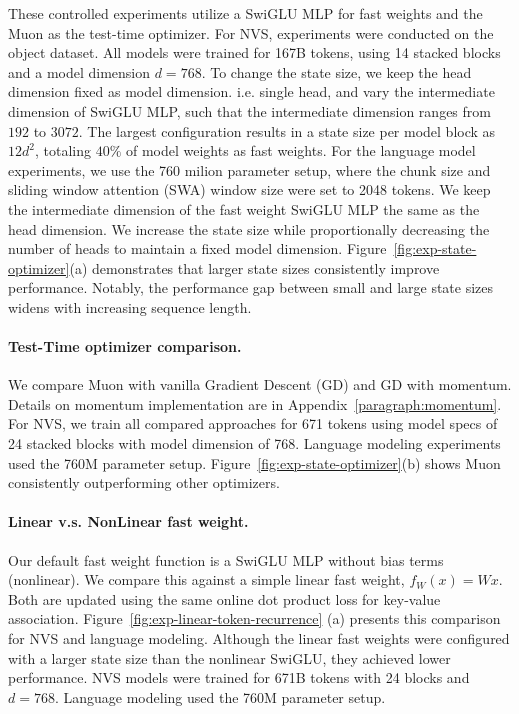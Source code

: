 \documentclass{article}
\begin{document}
These controlled experiments utilize a SwiGLU MLP for fast weights and the Muon as the test-time optimizer.
For NVS, experiments were conducted on the object dataset. All models were trained for 167B tokens, using 14 stacked blocks and a model dimension $d=768$. To change the state size, we keep the head dimension fixed as model dimension. i.e. single head, and vary the intermediate dimension of SwiGLU MLP, such that the intermediate dimension ranges from $192$ to $3072$. The largest configuration results in a state size per model block as $12d^2$, totaling $40\%$ of model weights as fast weights.  For the language model experiments, we use the 760 milion parameter setup, where the chunk size and sliding window attention (SWA) window size were set to 2048 tokens. We keep the intermediate dimension of the fast weight SwiGLU MLP the same as the head dimension. We increase the state size while proportionally decreasing the number of heads to maintain a fixed model dimension. Figure~\ref{fig:exp-state-optimizer}(a) demonstrates that larger state sizes consistently improve performance. Notably, the performance gap between small and large state sizes widens with increasing sequence length.

\paragraph{Test-Time optimizer comparison. }
We compare Muon with vanilla Gradient Descent (GD) and GD with momentum. Details on momentum implementation are in Appendix~\ref{paragraph:momentum}.   For NVS, we train all compared approaches for 671 tokens using model specs of 24 stacked blocks with model dimension of 768. Language modeling experiments used the 760M parameter setup. Figure~\ref{fig:exp-state-optimizer}(b) shows Muon consistently outperforming other optimizers.

\paragraph{Linear v.s. NonLinear fast weight.} Our default fast weight function is a SwiGLU MLP without bias terms (nonlinear). We compare this against a simple linear fast weight, $f_W(x) = Wx$. Both are updated using the same online dot product loss for key-value association. Figure~\ref{fig:exp-linear-token-recurrence} (a) presents this comparison for NVS and language modeling. Although the linear fast weights were configured with a larger state size than the nonlinear SwiGLU, they achieved lower performance.  NVS models were trained for 671B tokens with 24 blocks and $d=768$.  Language modeling used the 760M parameter setup.
\end{document}

